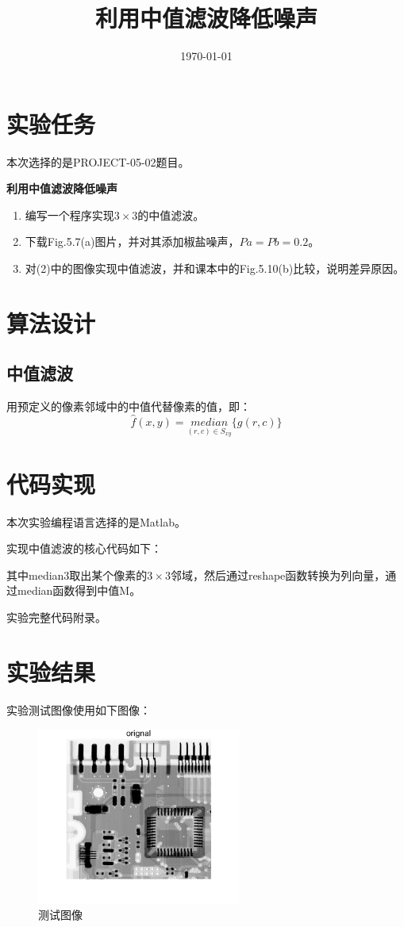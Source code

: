 \documentclass{../source/Experiment}
\title{利用中值滤波降低噪声}
\date{\today}
\begin{document}
\makecover
\section{实验任务}
本次选择的是PROJECT-05-02题目。

\bfseries{利用中值滤波降低噪声}

\begin{enumerate}
    \item 编写一个程序实现$3 \times 3$的中值滤波。
    \item 下载Fig.5.7(a)图片，并对其添加椒盐噪声，$Pa = Pb = 0.2$。
    \item 对(2)中的图像实现中值滤波，并和课本中的Fig.5.10(b)比较，说明差异原因。
\end{enumerate}
\section{算法设计}
\subsection{中值滤波}
用预定义的像素邻域中的中值代替像素的值，即：
$$\hat{f}(x,y) = \underset{(r,c) \in S_{xy}}{median}\{ g(r,c)\}
$$

\section{代码实现}
本次实验编程语言选择的是Matlab。

实现中值滤波的核心代码如下：



其中median3取出某个像素的$3 \times 3$邻域，然后通过reshape函数转换为列向量，通过median函数得到中值M。

实验完整代码附录。
\section{实验结果}
实验测试图像使用如下图像：
\begin{figure}[H]
    \centering
    \includegraphics[width = 0.6\textwidth]{第二次/f1.png}
    \caption{测试图像}
\end{figure}
\end{document}
